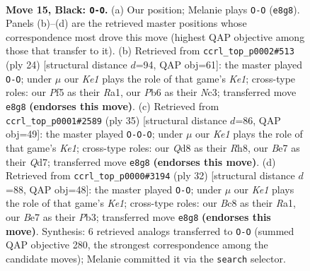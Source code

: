 \documentclass[11pt]{article}
\begin{document}
\clearpage

\begin{figure}[p]\centering
\begin{subfigure}{0.46\textwidth}\centering
\resizebox{\linewidth}{!}{%
\newchessgame
\chessboard[
  setfen={rnbqk2r/p3b2p/1pp3pP/3p1pP1/P2P1P2/1PN1P3/8/R2QKBNR b KQkq - 0 15},
  showmover=false,
  pgfstyle=straightmove, color=movearrow, markmove={e8-g8}
]}
\caption{}
\end{subfigure}\hfill
\begin{subfigure}{0.46\textwidth}\centering
\resizebox{\linewidth}{!}{%
\newchessgame
\chessboard[
  setfen={r2qk1nr/1pp2p2/3p2p1/p1nPp2p/2P1P2P/1PN2BP1/P4P2/R1Q1K2R w KQkq - 1 13},
  showmover=false,
  pgfstyle=straightmove, color=movearrow, markmove={e1-g1}
]}
\caption{}
\end{subfigure}
\\[4pt]
\begin{subfigure}{0.46\textwidth}\centering
\resizebox{\linewidth}{!}{%
\newchessgame
\chessboard[
  setfen={r3k2r/3qb2p/1pp1bpp1/p1p1p3/P3P2N/1P1PBQP1/2P3PP/R3R1K1 b kq - 1 18},
  showmover=false,
  pgfstyle=straightmove, color=movearrow, markmove={e8-c8}
]}
\caption{}
\end{subfigure}\hfill
\begin{subfigure}{0.46\textwidth}\centering
\resizebox{\linewidth}{!}{%
\newchessgame
\chessboard[
  setfen={2r1kb1r/1p2p2p/4q3/1N1p1p2/2pPn1p1/1P2P3/P1P1BPPP/R2QK2R w KQk - 1 17},
  showmover=false,
  pgfstyle=straightmove, color=movearrow, markmove={e1-g1}
]}
\caption{}
\end{subfigure}
\caption{\textbf{Move 15, Black: \texttt{O-O}.} (a) Our position; Melanie plays \texttt{O-O} (\texttt{e8g8}). Panels (b)--(d) are the retrieved master positions whose correspondence most drove this move (highest QAP objective among those that transfer to it). (b) Retrieved from \texttt{ccrl\_top\_p0002\#513} (ply 24) [structural distance $d$=94, QAP obj=61]: the master played \texttt{O-O}; under $\mu$ our \emph{Ke1} plays the role of that game's \emph{Ke1}; cross-type roles: our \emph{P}f5 as their \emph{R}a1, our \emph{P}b6 as their \emph{N}c3; transferred move \texttt{e8g8} \textbf{(endorses this move)}. (c) Retrieved from \texttt{ccrl\_top\_p0001\#2589} (ply 35) [structural distance $d$=86, QAP obj=49]: the master played \texttt{O-O-O}; under $\mu$ our \emph{Ke1} plays the role of that game's \emph{Ke1}; cross-type roles: our \emph{Q}d8 as their \emph{R}h8, our \emph{B}e7 as their \emph{Q}d7; transferred move \texttt{e8g8} \textbf{(endorses this move)}. (d) Retrieved from \texttt{ccrl\_top\_p0000\#3194} (ply 32) [structural distance $d$=88, QAP obj=48]: the master played \texttt{O-O}; under $\mu$ our \emph{Ke1} plays the role of that game's \emph{Ke1}; cross-type roles: our \emph{B}c8 as their \emph{R}a1, our \emph{B}e7 as their \emph{P}b3; transferred move \texttt{e8g8} \textbf{(endorses this move)}. Synthesis: 6 retrieved analogs transferred to \texttt{O-O} (summed QAP objective 280, the strongest correspondence among the candidate moves); Melanie committed it via the \texttt{search} selector.}
\label{fig:thought-m29}
\end{figure}
\end{document}
